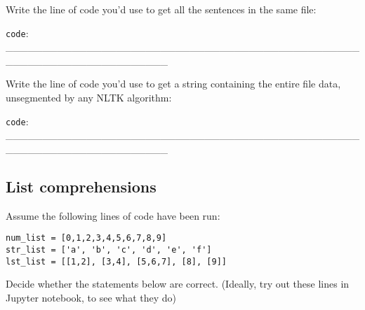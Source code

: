 \documentclass[a4paper,11pt]{scrartcl}
\begin{document}
Write the line of code you'd use to get all the sentences in the same file:

\verb|code|: \_\_\_\_\_\_\_\_\_\_\_\_\_\_\_\_\_\_\_\_\_\_\_\_\_\_\_\_\_\_\_\_\_\_\_\_\_\_\_\_\_\_\_\_\_\_\_\_\_\_\_\_\_\_\_\_\_\_\_\_\_\_\_\_\_\_\_\_\_\_

Write the line of code you'd use to get a string containing the entire file data, unsegmented by any NLTK algorithm:

\verb|code|: \_\_\_\_\_\_\_\_\_\_\_\_\_\_\_\_\_\_\_\_\_\_\_\_\_\_\_\_\_\_\_\_\_\_\_\_\_\_\_\_\_\_\_\_\_\_\_\_\_\_\_\_\_\_\_\_\_\_\_\_\_\_\_\_\_\_\_\_\_\_



\subsection{List comprehensions}

Assume the following lines of code have been run:

{\singlespacing
\begin{verbatim}
num_list = [0,1,2,3,4,5,6,7,8,9]
str_list = ['a', 'b', 'c', 'd', 'e', 'f']
lst_list = [[1,2], [3,4], [5,6,7], [8], [9]]
\end{verbatim}
}


Decide whether the statements below are correct.
(Ideally, try out these lines in Jupyter notebook, to see what they do)
\end{document}
